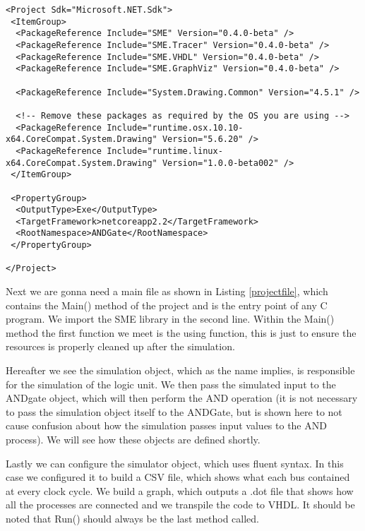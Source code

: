         \begin{lstlisting}[language={[Sharp]C}, caption={The .csproj file needed for code       execution},captionpos=b, label = csproj]
<Project Sdk="Microsoft.NET.Sdk">
 <ItemGroup>
  <PackageReference Include="SME" Version="0.4.0-beta" />
  <PackageReference Include="SME.Tracer" Version="0.4.0-beta" />
  <PackageReference Include="SME.VHDL" Version="0.4.0-beta" />
  <PackageReference Include="SME.GraphViz" Version="0.4.0-beta" />
        
  <PackageReference Include="System.Drawing.Common" Version="4.5.1" />
        
  <!-- Remove these packages as required by the OS you are using -->
  <PackageReference Include="runtime.osx.10.10-x64.CoreCompat.System.Drawing" Version="5.6.20" />
  <PackageReference Include="runtime.linux-x64.CoreCompat.System.Drawing" Version="1.0.0-beta002" />
 </ItemGroup>

 <PropertyGroup>
  <OutputType>Exe</OutputType>
  <TargetFramework>netcoreapp2.2</TargetFramework>
  <RootNamespace>ANDGate</RootNamespace>
 </PropertyGroup>

</Project>
        \end{lstlisting}
\newpage
        Next we are gonna need a main file as shown in Listing \ref{projectfile}, which contains the Main() method of the project and is the entry point of any C program. We import the SME library in the second line. Within the Main() method the first function we meet is the using function, this is just to ensure the resources is properly cleaned up after the simulation.
        
        Hereafter we see the simulation object, which as the name implies, is responsible for the simulation of the logic unit. We then pass the simulated input to the ANDgate object, which will then perform the AND operation (it is not necessary to pass the simulation object itself to the ANDGate, but is shown here to not cause confusion about how the simulation passes input values to the AND process). We will see how these objects are defined shortly. 
        
        Lastly we can configure the simulator object, which uses fluent syntax. In this case we configured it to build a CSV file, which shows what each bus contained at every clock cycle. We build a graph, which outputs a .dot file that shows how all the processes are connected and we transpile the code to VHDL. It should be noted that Run() should always be the last method called.
        
